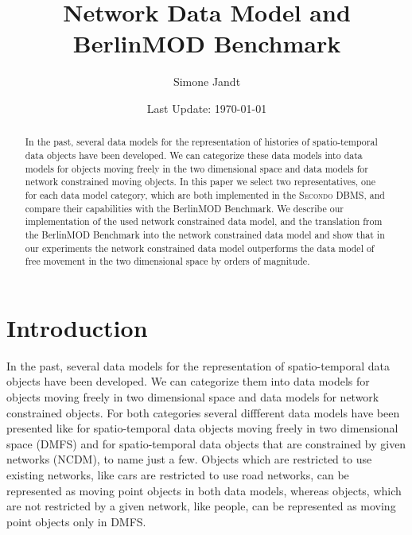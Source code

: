 \documentclass[a4paper]{article}
\title{Network Data Model and BerlinMOD Benchmark}
\author{Simone Jandt}
\date{Last Update: \today}
\newcommand{\secondo}{\textsc{Secondo}}
\newcommand{\bmodb} {BerlinMOD Benchmark}
\begin{document}
\maketitle
\begin{abstract}
In the past, several data models for the representation of histories of
spatio-temporal data objects have been developed. We can categorize these data models
into data models for objects moving freely in the two dimensional space and data
models for network constrained moving objects. In this paper we select two representatives,
one for each data model category, which are both implemented in the \secondo{} DBMS,
and compare their capabilities with the \bmodb{}. We describe our implementation
of the used network constrained data model, and the translation
from the \bmodb{} into the network constrained data model and show
that in our experiments the network constrained data model outperforms the data
model of free movement in the two dimensional space by orders of magnitude.
\end{abstract}
\section{Introduction}
In the past, several data models for the representation of
spatio-temporal data objects have been developed. We can categorize them into
data models for objects moving freely in two dimensional space and data models
for network constrained objects. For both categories several diffferent data models
have been presented like
\cite{DataModelDataStructureGueting,RepresentingMovingObjectsGueting,STAUPelekis,HERMESMDCPelekis}
for spatio-temporal data objects moving freely in two dimensional space (DMFS) and
\cite{DynamicTransportNetworkDing,NetworkGueting,NetworkJensen,NetworkVazirgiannis}
for spatio-temporal data objects that are constrained by given networks (NCDM),
to name just a few. Objects which are restricted to use existing networks,
like cars are restricted to use road networks, can be represented as moving point
objects in both data models, whereas objects, which are not restricted by a given
network, like people, can be represented as moving point objects only in DMFS.
\end{document}
